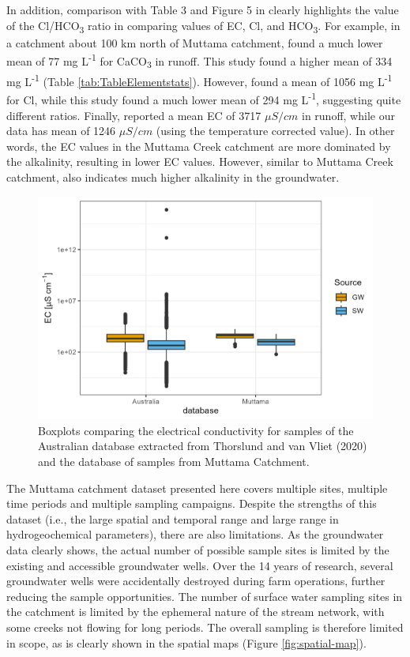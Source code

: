 \documentclass[, manuscript]{copernicus}
\begin{document}
In addition, comparison with Table 3 and Figure 5 in \citet{Hughes2007}
clearly highlights the value of the Cl/HCO\textsubscript{3} ratio in
comparing values of EC, Cl, and HCO\textsubscript{3}. For example, in a
catchment about 100 km north of Muttama catchment, \citet{Hughes2007}
found a much lower mean of 77 mg L\textsuperscript{-1} for
CaCO\textsubscript{3} in runoff. This study found a higher mean of 334
mg L\textsuperscript{-1} (Table \ref{tab:TableElementstats}). However,
\citet{Hughes2007} found a mean of 1056 mg L\textsuperscript{-1} for Cl,
while this study found a much lower mean of 294 mg
L\textsuperscript{-1}, suggesting quite different ratios. Finally,
\citet{Hughes2007} reported a mean EC of 3717 \(\mu S/cm\) in runoff,
while our data has mean of 1246 \(\mu S/cm\) (using the temperature
corrected value). In other words, the EC values in the Muttama Creek
catchment are more dominated by the alkalinity, resulting in lower EC
values. However, similar to Muttama Creek catchment, \citet{Hughes2007}
also indicates much higher alkalinity in the groundwater.

\begin{figure}
\includegraphics[width=0.8\linewidth]{Figures/globalboxplot} \caption{Boxplots comparing the electrical conductivity for samples of the Australian database extracted from Thorslund and van Vliet (2020) and the database of samples from Muttama Catchment.}\label{fig:global-plot}
\end{figure}

The Muttama catchment dataset presented here covers multiple sites,
multiple time periods and multiple sampling campaigns. Despite the
strengths of this dataset (i.e., the large spatial and temporal range
and large range in hydrogeochemical parameters), there are also
limitations. As the groundwater data clearly shows, the actual number of
possible sample sites is limited by the existing and accessible
groundwater wells. Over the 14 years of research, several groundwater
wells were accidentally destroyed during farm operations, further
reducing the sample opportunities. The number of surface water sampling
sites in the catchment is limited by the ephemeral nature of the stream
network, with some creeks not flowing for long periods. The overall
sampling is therefore limited in scope, as is clearly shown in the
spatial maps (Figure \ref{fig:spatial-map}).
\end{document}

